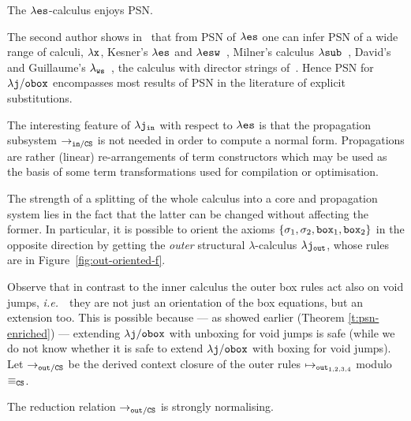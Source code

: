 \documentclass{LMCS}
\newcommand{\ie}{{\it  i.e.}~}
\renewcommand{\>}{\rightarrow}
\def\lam{\lambda}
\def\sig{\sigma}
\newcommand{\Rew}[1]{\rightarrow_{#1}}
\newcommand{\rRew}[1]{\mapsto_{#1}}
\newcommand{\lx}{\lam{\tt x}}
\newcommand{\es}{{\tt es}}
\newcommand{\esw}{{\tt esw}}
\newcommand{\les}{\lam \es}
\newcommand{\lesw}{\lam \esw}
\newcommand{\dis}{{\tt j}}
\newcommand{\out}{{\tt out}}
\newcommand{\iinn}{{\tt in}}
\newcommand{\ldisout}{\lam \dis_{\out}}
\newcommand{\ldisin}{\lam \dis_{\iinn}}
\newcommand{\CS}{{\tt CS}}
\newcommand{\set}[1]{ \{ #1 \}}
\newcommand{\modulo}[2]{#1/#2}
\newcommand{\ignore}[1]{}
\newcommand{\ldisf}{\lam \modulo{\dis}{\fsymb}}
\newcommand{\fsymb}{\osymb\boite}
\newcommand{\osymb}{{\tt o}}
\newcommand{\eqcs}{\equiv_\CS}
\newcommand{\inn}{\modulo{{\tt in}}{\CS}}
\newcommand{\outm}{\modulo{{\tt out}}{\CS}}
\newcommand{\lsub}{\lam {\tt sub}}
\newcommand{\boite}{{\tt box}}
\newcommand{\sigt}{\boite_1}
\newcommand{\sigq}{\boite_2}
\begin{document}
\begin{cor}
\label{cor:les-psn}
The $\les$-calculus enjoys PSN.
\end{cor}

The second author shows in~\cite{Kes09}
that from PSN of $\les$ one can infer PSN of a wide range of calculi,
$\lx$, Kesner's $\les$ and $\lesw$~\cite{Kes07},
Milner's calculus $\lsub$~\cite{Milner07}, David's
and Guillaume's $\lam_{\tt ws}$~\cite{DBLP:journals/mscs/DavidG01}, the
calculus with director strings of~\cite{SinotFM03}. Hence PSN for $\ldisf$ encompasses
most results of PSN in the literature of explicit substitutions.

\noindent The interesting feature of $\ldisin$ with respect to $\les$ is that
the propagation subsystem $\Rew{\inn}$ is not needed in order to
compute a normal form. Propagations are rather (linear)
re-arrangements of term constructors which may be used as the basis of
some term transformations used for compilation or
optimisation.\medskip

The strength of a splitting of the whole calculus into a core and 
propagation system lies in the fact that 
the latter can be changed without affecting the former. In
particular, it is possible to orient the axioms $\set{\sig_1, \sig_2,
  \sigt, \sigq}$ in the opposite direction 
by getting the \textit{outer} structural $\lam$-calculus
$\ldisout$, whose rules are in Figure~\ref{fig:out-oriented-f}.

Observe that  in contrast  to the inner  calculus the outer  box rules
act also on  void jumps,  \ie\ they  are not
just an orientation  of the box equations, but  an extension too. This
is  possible because  --- as  showed  earlier (Theorem
\ref{t:psn-enriched})       ---       extending      $\ldisf$       with
unboxing for void jumps is safe (while we
do  not know  whether it  is safe  to extend  $\ldisf$ with
boxing for  void  jumps).    Let
$\Rew{\outm}$  be  the derived  context  closure  of  the outer  rules
$\rRew{\out_{1,2,3,4}}$ modulo $\eqcs$.


\begin{lem}
\label{l:out-terminates}
The reduction relation $\Rew{\outm}$ is strongly normalising.
\end{lem}

\ignore{
\begin{proof}
Informal proof: let $|C|$ denote the size of a context. Then define 
$M(t)=\sum_{t=C[v[x/u]]}|C|$, \ie, the sum of the size of the contexts containing each jump of $t$. It is easily seen that such a measure decreases with any $\Rew{\out}$-step and is invariant by $\eqcs$.
\end{proof}}
\end{document}
